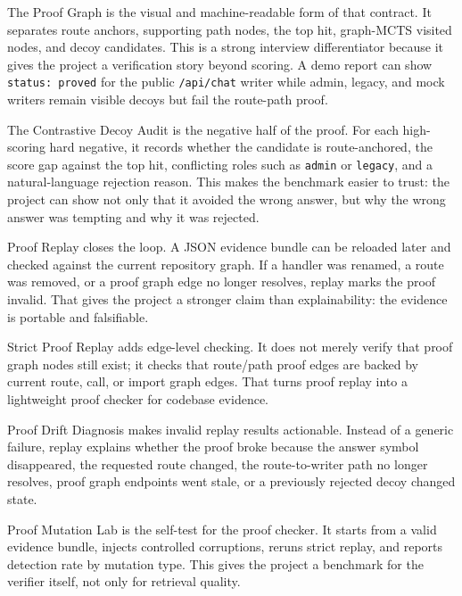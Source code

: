 \documentclass[UTF8,12pt,openany]{ctexbook}
\begin{document}
The Proof Graph is the visual and machine-readable form of that contract. It separates route anchors, supporting path nodes, the top hit, graph-MCTS visited nodes, and decoy candidates. This is a strong interview differentiator because it gives the project a verification story beyond scoring. A demo report can show \texttt{status: proved} for the public \texttt{/api/chat} writer while admin, legacy, and mock writers remain visible decoys but fail the route-path proof.\par

The Contrastive Decoy Audit is the negative half of the proof. For each high-scoring hard negative, it records whether the candidate is route-anchored, the score gap against the top hit, conflicting roles such as \texttt{admin} or \texttt{legacy}, and a natural-language rejection reason. This makes the benchmark easier to trust: the project can show not only that it avoided the wrong answer, but why the wrong answer was tempting and why it was rejected.\par

Proof Replay closes the loop. A JSON evidence bundle can be reloaded later and checked against the current repository graph. If a handler was renamed, a route was removed, or a proof graph edge no longer resolves, replay marks the proof invalid. That gives the project a stronger claim than explainability: the evidence is portable and falsifiable.\par

Strict Proof Replay adds edge-level checking. It does not merely verify that proof graph nodes still exist; it checks that route/path proof edges are backed by current route, call, or import graph edges. That turns proof replay into a lightweight proof checker for codebase evidence.\par

Proof Drift Diagnosis makes invalid replay results actionable. Instead of a generic failure, replay explains whether the proof broke because the answer symbol disappeared, the requested route changed, the route-to-writer path no longer resolves, proof graph endpoints went stale, or a previously rejected decoy changed state.\par

Proof Mutation Lab is the self-test for the proof checker. It starts from a valid evidence bundle, injects controlled corruptions, reruns strict replay, and reports detection rate by mutation type. This gives the project a benchmark for the verifier itself, not only for retrieval quality.\par
\end{document}
